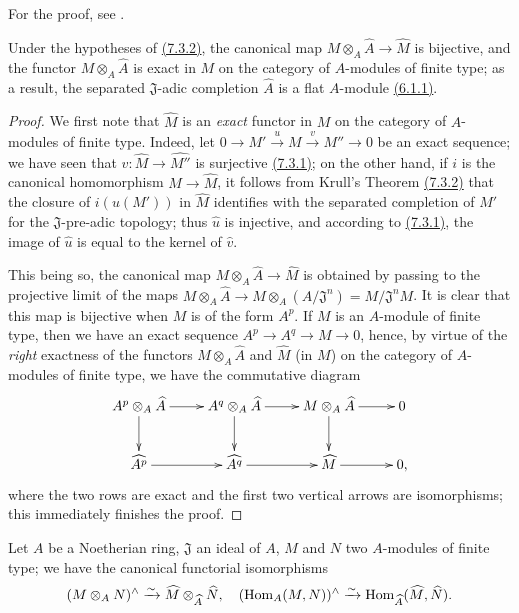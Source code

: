 For the proof, see \cite[p.~2--04]{I-1}.

\begin{cor}[7.3.3]
\label{0.7.3.3}
Under the hypotheses of \hyperref[0.7.3.2]{(7.3.2)}, the canonical map
$M\otimes_A\widehat{A}\to\widehat{M}$ is bijective, and the functor $M\otimes_A\widehat{A}$
is exact in $M$ on the category of $A$-modules of finite type; as a result, the separated
$\mathfrak{J}$-adic completion $\widehat{A}$ is a flat $A$-module
\hyperref[0.6.1.1]{(6.1.1)}.
\end{cor}

\begin{proof}
\label{proof-0.7.3.3}
We first note that $\widehat{M}$ is an {\em exact} functor in $M$ on the category of
$A$-modules of finite type. Indeed, let $0\to M'\xrightarrow{u}M\xrightarrow{v}M''\to 0$ be
an exact sequence; we have seen that $\widehat{v}:\widehat{M}\to\widehat{M''}$ is surjective
\hyperref[0.7.3.1]{(7.3.1)}; on the other hand, if $i$ is the canonical homomorphism
$M\to\widehat{M}$, it follows from Krull's Theorem \hyperref[0.7.3.2]{(7.3.2)} that the
closure of $i(u(M'))$ in $\widehat{M}$ identifies with the separated completion of $M'$ for
the $\mathfrak{J}$-pre-adic topology; thus $\widehat{u}$ is injective, and according to
\hyperref[0.7.3.1]{(7.3.1)}, the image of $\widehat{u}$ is equal to the kernel of
$\widehat{v}$.

This being so, the canonical map $M\otimes_A\widehat{A}\to\widehat{M}$ is obtained by passing
to the projective limit of the maps
$M\otimes_A\widehat{A}\to M\otimes_A(A/\mathfrak{J}^n)=M/\mathfrak{J}^n M$. It is clear that
this map is bijective when $M$ is of the form $A^p$. If $M$ is an $A$-module of finite type,
then we have an exact sequence $A^p\to A^q\to M\to 0$, hence, by virtue of the {\em right}
exactness of the functors $M\otimes_A\widehat{A}$ and $\widehat{M}$ (in $M$) on the category
of $A$-modules of finite type, we have the commutative diagram
\[
  \xymatrix{
    A^p\otimes_A\widehat{A}\ar[r]\ar[d] &
    A^q\otimes_A\widehat{A}\ar[r]\ar[d] &
    M\otimes_A\widehat{A}\ar[r]\ar[d] &
    0\\
    \widehat{A^p}\ar[r] &
    \widehat{A^q}\ar[r] &
    \widehat{M}\ar[r] &
    0,
  }
\]
where the two rows are exact and the first two vertical arrows are isomorphisms; this
immediately finishes the proof.
\end{proof}

\begin{cor}[7.3.4]
\label{0.7.3.4}
Let $A$ be a Noetherian ring, $\mathfrak{J}$ an ideal of $A$, $M$ and $N$ two $A$-modules of
finite type; we have the canonical functorial isomorphisms
\[
  (M\otimes_A N)^\wedge\xrightarrow{\sim}\widehat{M}\otimes_{\widehat{A}}\widehat{N},
  \quad
  ({\mathop{\mathrm{Hom}}\nolimits}_A(M,N))^\wedge\xrightarrow{\sim}{\mathop{\mathrm{Hom}}\nolimits}_{\widehat{A}}(\widehat{M},\widehat{N}).
\]
\end{cor}

